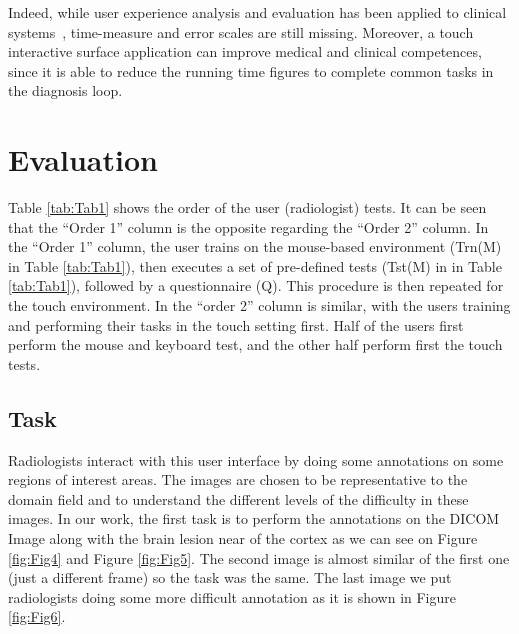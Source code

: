 \documentclass{chi-ext}
\begin{document}
Indeed, while user experience analysis and evaluation has been applied to clinical systems~\cite{crisan2013optimization},  time-measure and error scales are still missing. Moreover, a touch interactive surface application can improve medical and clinical competences, since it is able to reduce the running time figures to complete common tasks in the diagnosis loop.

\section{Evaluation}

Table \ref{tab:Tab1} shows the order of the user (radiologist) tests. It can be seen that the ``Order 1'' column is the opposite regarding the ``Order 2'' column. In the ``Order 1'' column, the user trains on the mouse-based environment (Trn(M) in Table \ref{tab:Tab1}), then executes a set of pre-defined tests (Tst(M) in in Table \ref{tab:Tab1}), followed by a questionnaire (Q). This procedure is then repeated for the touch environment. In the ``order 2'' column is similar, with the users training and performing their tasks in the touch setting first. Half of the users first perform the mouse and keyboard test, and the other half perform first the touch tests.

\subsection{Task}

Radiologists interact with this user interface by doing some annotations on some regions of interest areas. The images are chosen to be representative to the domain field and to understand the different levels of the difficulty in these images. In our work, the first task is to perform the annotations on the DICOM Image along with the brain lesion near of the cortex as we can see on Figure \ref{fig:Fig4} and Figure \ref{fig:Fig5}. The second image is almost similar of the first one (just a different frame) so the task was the same. The last image we put radiologists doing some more difficult annotation as it is shown in Figure \ref{fig:Fig6}.
\end{document}
